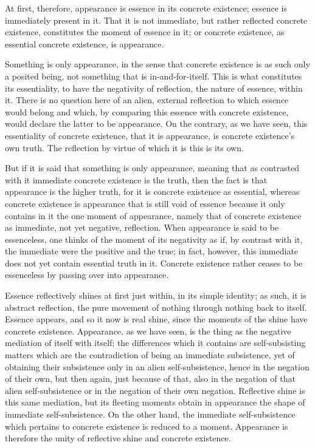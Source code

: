 At first, therefore, appearance is
essence in its concrete existence;
essence is immediately present in it.
That it is not immediate,
but rather reflected concrete existence,
constitutes the moment of essence in it;
or concrete existence,
as essential concrete existence,
is appearance.

Something is only appearance,
in the sense that concrete existence is
as such only a posited being,
not something that is in-and-for-itself.
This is what constitutes its essentiality,
to have the negativity of reflection,
the nature of essence, within it.
There is no question here of an alien,
external reflection to which essence would belong
and which, by comparing this essence with concrete existence,
would declare the latter to be appearance.
On the contrary, as we have seen,
this essentiality of concrete existence,
that it is appearance, is
concrete existence's own truth.
The reflection by virtue of which
it is this is its own.

But if it is said that something is only appearance,
meaning that as contrasted with it
immediate concrete existence is the truth,
then the fact is that appearance is the higher truth,
for it is concrete existence as essential,
whereas concrete existence is appearance
that is still void of essence
because it only contains in it
the one moment of appearance,
namely that of concrete existence
as immediate, not yet negative, reflection.
When appearance is said to be essenceless,
one thinks of the moment of its negativity as if,
by contrast with it, the immediate were
the positive and the true;
in fact, however, this immediate does not
yet contain essential truth in it.
Concrete existence rather ceases to be essenceless
by passing over into appearance.

Essence reflectively shines at first
just within, in its simple identity;
as such, it is abstract reflection,
the pure movement of nothing
through nothing back to itself.
Essence appears, and so it now is real shine,
since the moments of the shine have concrete existence.
Appearance, as we have seen, is the thing as
the negative mediation of itself with itself;
the differences which it contains
are self-subsisting matters
which are the contradiction of
being an immediate subsistence,
yet of obtaining their subsistence
only in an alien self-subsistence,
hence in the negation of their own,
but then again, just because of that,
also in the negation of that alien self-subsistence
or in the negation of their own negation.
Reflective shine is this same mediation,
but its fleeting moments obtain in appearance
the shape of immediate self-subsistence.
On the other hand, the immediate self-subsistence
which pertains to concrete existence is reduced to a moment.
Appearance is therefore the unity of
reflective shine and concrete existence.

